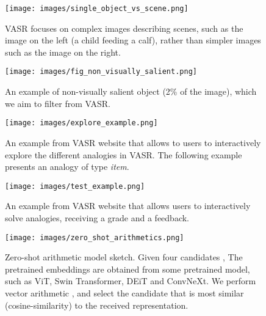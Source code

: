 \documentclass[letterpaper]{article} \usepackage{aaai23}  \usepackage{times}  \usepackage{helvet}  \usepackage{courier}  \usepackage[hyphens]{url}  \usepackage{graphicx} \urlstyle{rm} \def\UrlFont{\rm}  \usepackage{natbib}  \usepackage{caption} \frenchspacing  \setlength{\pdfpagewidth}{8.5in}  \setlength{\pdfpageheight}{11in}  \usepackage{algorithm}
\begin{document}
\begin{figure}[!h]
\centering
\newcommand{\figlen}[0]{\columnwidth}
    \texttt{[image: images/single\_object\_vs\_scene.png]}\\
    \caption{VASR focuses on complex images describing scenes, such as the image on the left (a child feeding a calf), rather than simpler images such as the image on the right.}
    \label{fig:single_object_vs_scene}
\end{figure}

\begin{figure}[!tb]
\centering
    \texttt{[image: images/fig\_non\_visually\_salient.png]}\\
    \caption{An example of non-visually salient object (2\% of the image), which we aim to filter from VASR.}
    \label{fig:fig_non_visually_salient}
\end{figure}

\begin{figure}[!h]
\centering
\newcommand{\figlen}[0]{\columnwidth}
    \texttt{[image: images/explore\_example.png]}\\
    \caption{An example from VASR website that allows to users to interactively explore the different analogies in VASR. The following example presents an analogy of type \emph{item}.}
    \label{fig:explore_example}
\end{figure}

\begin{figure}[!h]
\centering
\newcommand{\figlen}[0]{\columnwidth}
    \texttt{[image: images/test\_example.png]}\\
    \caption{An example from VASR website that allows users to interactively solve analogies, receiving a grade and a feedback.}
    \label{fig:explore_test}
\end{figure}

\begin{figure}[!h]
\centering
\newcommand{\figlen}[0]{\columnwidth}
    \texttt{[image: images/zero\_shot\_arithmetics.png]}\\
    \caption{Zero-shot arithmetic model sketch. Given four candidates , \newline\newline The pretrained embeddings are obtained from some pretrained model, such as ViT, Swin Transformer, DEiT and ConvNeXt. We perform vector arithmetic , and select the candidate that is most similar (cosine-similarity) to the received representation.}
    \label{fig:zero_shot_arithmetics}
\end{figure}
\end{document}
